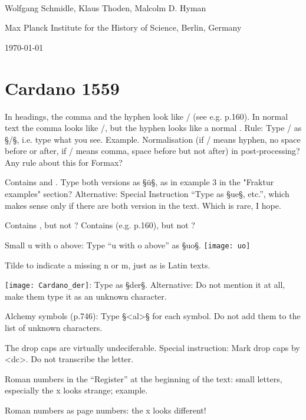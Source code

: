 \documentclass[fontsize=11pt, paper=a4, 
DIV15,
normalheadings,
parskip=half-, 
pointlessnumbers]{scrartcl}
\begin{document}
\begin{center}
{} \\[5mm]
\large Wolfgang Schmidle, Klaus Thoden, Malcolm D. Hyman

\normalsize Max Planck Institute for the History of Science, Berlin, Germany

\today
\end{center}

\tableofcontents

\section{Cardano 1559}

In headings, the comma and the hyphen look like / (see e.g. p.160). In normal text the comma looks like /, but the hyphen looks like a normal \fraktur{-}. Rule: Type / as §/§, i.e. type what you see. Example. Normalisation (if / means hyphen, no space before or after, if / means comma, space before but not after) in post-processing? Any rule about this for Formax?

Contains  and . Type both versions as §ü§, as in example 3 in the "Fraktur examples" section? Alternative: Special Instruction “Type  as §{ue}§, etc.”, which makes sense only if there are both version in the text. Which is rare, I hope.

Contains  , but not  ? Contains  (e.g. p.160), but not  ?  

Small u with o above: Type “u with o above” as §{uo}§.
\texttt{[image: uo]}

Tilde to indicate a missing n or m, just as is Latin texts.

\texttt{[image: Cardano\_der]}: Type as §{der}§. Alternative: Do not mention it at all, make them type it as an unknown character.

Alchemy symbols (p.746): Type §<al>§ for each symbol. Do not add them to the list of unknown characters.

The drop caps are virtually undeciferable. Special instruction: Mark drop caps by <dc>. Do not transcribe the letter.

Roman numbers in the “Register” at the beginning of the text: small letters, especially the x looks strange; example.

Roman numbers as page numbers: the x looks different!
\end{document}
